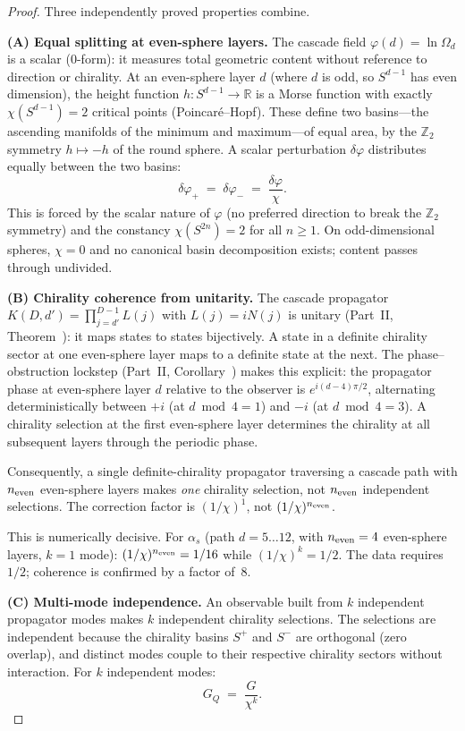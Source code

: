 \documentclass[12pt,a4paper]{article}
\begin{document}
\begin{proof}
Three independently proved properties combine.

\medskip
\textbf{(A) Equal splitting at even-sphere layers.}
The cascade field $\varphi(d)=\ln\Omega_d$ is a scalar (0-form): it measures total geometric content without reference to direction or chirality. At an even-sphere layer $d$ (where $d$ is odd, so $S^{d-1}$ has even dimension), the height function $h:S^{d-1}\to\mathbb{R}$ is a Morse function with exactly $\chi(S^{d-1})=2$ critical points (Poincar\'{e}--Hopf). These define two basins---the ascending manifolds of the minimum and maximum---of equal area, by the $\mathbb{Z}_2$ symmetry $h\mapsto -h$ of the round sphere. A scalar perturbation $\delta\varphi$ distributes equally between the two basins:
\[
\delta\varphi_+ \;=\; \delta\varphi_- \;=\; \frac{\delta\varphi}{\chi}.
\]
This is forced by the scalar nature of $\varphi$ (no preferred direction to break the $\mathbb{Z}_2$ symmetry) and the constancy $\chi(S^{2n})=2$ for all $n\geq 1$. On odd-dimensional spheres, $\chi=0$ and no canonical basin decomposition exists; content passes through undivided.

\medskip
\textbf{(B) Chirality coherence from unitarity.}
The cascade propagator $K(D,d')=\prod_{j=d'}^{D-1}L(j)$ with $L(j)=iN(j)$ is unitary (Part~II, Theorem~): it maps states to states bijectively. A state in a definite chirality sector at one even-sphere layer maps to a definite state at the next. The phase--obstruction lockstep (Part~II, Corollary~) makes this explicit: the propagator phase at even-sphere layer $d$ relative to the observer is $e^{i(d-4)\pi/2}$, alternating deterministically between $+i$ (at $d\bmod 4=1$) and $-i$ (at $d\bmod 4=3$). A chirality selection at the first even-sphere layer determines the chirality at all subsequent layers through the periodic phase.

Consequently, a single definite-chirality propagator traversing a cascade path with $n_{\rm even}$ even-sphere layers makes \emph{one} chirality selection, not $n_{\rm even}$ independent selections. The correction factor is $(1/\chi)^1$, not $(1/\chi)^{n_{\rm even}}$.

This is numerically decisive. For $\alpha_s$ (path $d=5\ldots 12$, with $n_{\rm even}=4$ even-sphere layers, $k=1$ mode): $(1/\chi)^{n_{\rm even}}=1/16$ while $(1/\chi)^k=1/2$. The data requires $1/2$; coherence is confirmed by a factor of~8.

\medskip
\textbf{(C) Multi-mode independence.}
An observable built from $k$ independent propagator modes makes $k$ independent chirality selections. The selections are independent because the chirality basins $S^+$ and $S^-$ are orthogonal (zero overlap), and distinct modes couple to their respective chirality sectors without interaction. For $k$ independent modes:
\[
G_Q \;=\; \frac{G}{\chi^k}.
\]


\end{proof}
\end{document}
